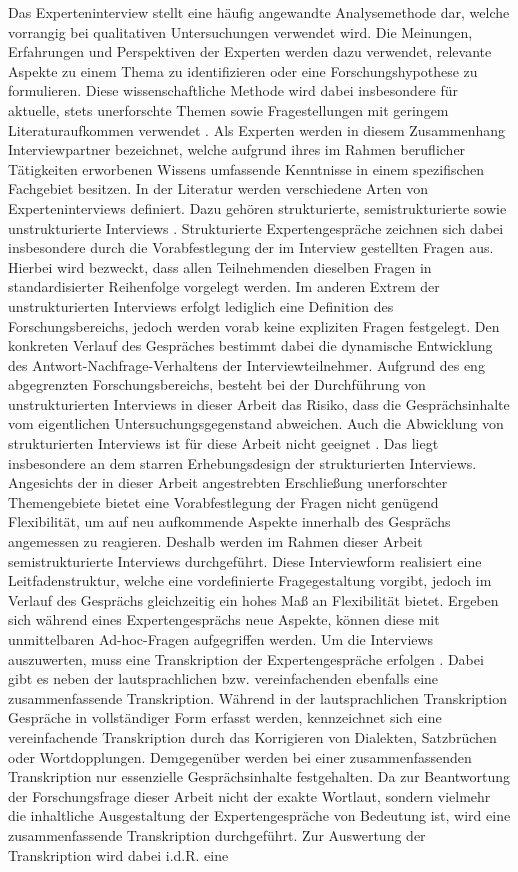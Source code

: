 Das Experteninterview stellt eine häufig angewandte Analysemethode dar, welche vorrangig bei qualitativen Untersuchungen verwendet wird. Die Meinungen, Erfahrungen und Perspektiven der Experten werden dazu verwendet, relevante Aspekte zu einem Thema zu identifizieren oder eine Forschungshypothese zu formulieren. Diese wissenschaftliche Methode wird dabei insbesondere für aktuelle, stets unerforschte Themen sowie Fragestellungen mit geringem Literaturaufkommen verwendet \cite[363 ff.]{Gerson.2021}. Als Experten werden in diesem Zusammenhang Interviewpartner bezeichnet, welche aufgrund ihres im Rahmen beruflicher Tätigkeiten erworbenen Wissens umfassende Kenntnisse in einem spezifischen Fachgebiet besitzen. In der Literatur werden verschiedene Arten von Experteninterviews definiert. Dazu gehören strukturierte, semistrukturierte sowie unstrukturierte Interviews \cite[363 ff.]{Gerson.2021}. Strukturierte Expertengespräche zeichnen sich dabei insbesondere durch die Vorabfestlegung der im Interview gestellten Fragen aus. Hierbei wird bezweckt, dass allen Teilnehmenden dieselben Fragen in standardisierter Reihenfolge vorgelegt werden. Im anderen Extrem der unstrukturierten Interviews erfolgt lediglich eine Definition des Forschungsbereichs, jedoch werden vorab keine expliziten Fragen festgelegt. Den konkreten Verlauf des Gespräches bestimmt dabei die dynamische Entwicklung des Antwort-Nachfrage-Verhaltens der Interviewteilnehmer. Aufgrund des eng abgegrenzten Forschungsbereichs, besteht bei der Durchführung von unstrukturierten Interviews in dieser Arbeit das Risiko, dass die Gesprächsinhalte vom eigentlichen Untersuchungsgegenstand abweichen. Auch die Abwicklung von strukturierten Interviews ist für diese Arbeit nicht geeignet \cite[244 ff.]{Hildebrandt.2015}. Das liegt insbesondere an dem starren Erhebungsdesign der strukturierten Interviews. Angesichts der in dieser Arbeit angestrebten Erschließung unerforschter Themengebiete bietet eine Vorabfestlegung der Fragen nicht genügend Flexibilität, um auf neu aufkommende Aspekte innerhalb des Gesprächs angemessen zu reagieren. Deshalb werden im Rahmen dieser Arbeit semistrukturierte Interviews durchgeführt. Diese Interviewform realisiert eine Leitfadenstruktur, welche eine vordefinierte Fragegestaltung vorgibt, jedoch im Verlauf des Gesprächs gleichzeitig ein hohes Maß an Flexibilität bietet. Ergeben sich während eines Expertengesprächs neue Aspekte, können diese mit unmittelbaren Ad-hoc-Fragen aufgegriffen werden. Um die Interviews auszuwerten, muss eine Transkription der Expertengespräche erfolgen \cite[244 ff.]{Hildebrandt.2015}. Dabei gibt es neben der lautsprachlichen bzw. vereinfachenden ebenfalls eine zusammenfassende Transkription. Während in der lautsprachlichen Transkription Gespräche in vollständiger Form erfasst werden, kennzeichnet sich eine vereinfachende Transkription durch das Korrigieren von Dialekten, Satzbrüchen oder Wortdopplungen. Demgegenüber werden bei einer zusammenfassenden Transkription  nur essenzielle Gesprächsinhalte festgehalten. Da zur Beantwortung der Forschungsfrage dieser Arbeit nicht der exakte Wortlaut, sondern vielmehr die inhaltliche Ausgestaltung der Expertengespräche von Bedeutung ist, wird eine zusammenfassende Transkription durchgeführt. Zur Auswertung der Transkription wird dabei i.d.R. eine 